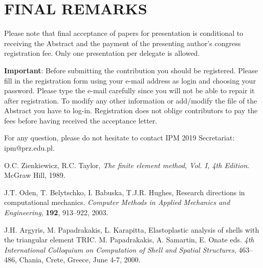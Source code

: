 \documentclass{ShortPaper_Instructions_LaTeX_IPM2019}
\begin{document}
\section{FINAL REMARKS}
\noindent Please note that final acceptance of papers for presentation is conditional to receiving the Abstract and the payment of the presenting author's congress registration fee. Only one presentation per delegate is allowed.

\textbf{Important}: Before submitting the contribution you should be registered. Please fill in the registration form using your e-mail address as login and choosing your password. Please type the e-mail carefully since you will not be able to repair it after registration. To modify any other information or add/modify the file of the Abstract you have to log-in. Registration does not oblige contributors to pay the fees before having received the acceptance letter.

For any question, please do not hesitate to contact IPM 2019 Secretariat: ipm@prz.edu.pl.

\begin{thebibliography}{99}

 O.C. Zienkiewicz, R.C. Taylor,
\textit{The finite element method, Vol. I, 4th Edition}. McGraw Hill, 1989.

 J.T. Oden, T. Belytschko, I. Babuska, T.J.R. Hughes,
Research directions in computational mechanics.
\textit{Computer Methods in Applied Mechanics and Engineering}, \textbf{192}, 913--922, 2003.

 J.H. Argyris, M. Papadrakakis, L. Karapitta,
Elastoplastic analysis of shells with the triangular element TRIC.
M. Papadrakakis, A. Samartin, E. Onate eds.
\textit{4th International Colloquium on Computation of Shell and Spatial Structures}, 463--486,
Chania, Crete, Greece, June 4-7, 2000.

\end{thebibliography}
\end{document}
